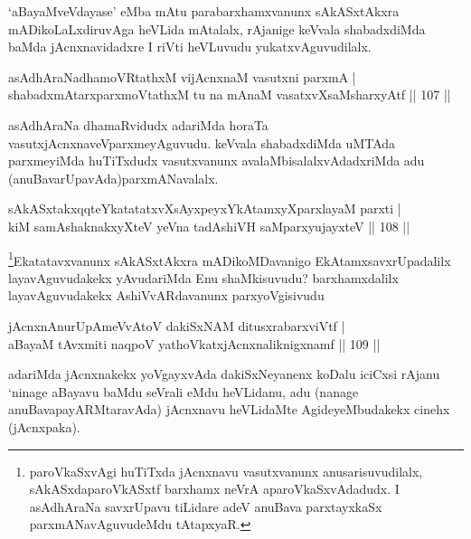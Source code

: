 \begin{artha}
`aBayaMveVdayase' eMba mAtu parabarxhamxvanunx sAkASxtAkxra mADikoLaLxdiruvAga heVLida mAtalalx, rAjanige keVvala shabadxdiMda baMda jAcnxnavidadxre I riVti heVLuvudu yukatxvAguvudilalx.
\end{artha}

\begin{shl}
asAdhAraNadhamoVRtathxM vijAcnxnaM vasutxni parxmA |\\
shabadxmAtarxparxmoVtathxM tu na mAnaM vasatxvXsaMsharxyAtf \hfill || 107 || 
\end{shl}

\begin{artha}
asAdhAraNa dhamaRvidudx adariMda horaTa vasutxjAcnxnaveV\break parxmeyAguvudu. keVvala shabadxdiMda uMTAda parxmeyiMda huTiTxdudx vasutxvanunx avalaMbisalalxvAdadxriMda adu (anuBavarUpavAda)\break parxmANavalalx.
\end{artha}

\begin{shl}
sAkASxtakxqqteYkatatatxvXsAyxpeyxYkAtamxyXparxlayaM parxti |\\
kiM samAshaknakxyXteV yeVna tadAshiVH saMparxyujayxteV \hfill || 108 || 
\end{shl}

\begin{artha}
\footnote{paroVkaSxvAgi huTiTxda jAcnxnavu vasutxvanunx anusarisuvudilalx, sAkASxdaparoVkASxtf barxhamx neVrA aparoVkaSxvAdadudx. I asAdhAraNa savxrUpavu tiLidare adeV anuBava parxtayxkaSx parxmANavAguvudeMdu tAtapxyaR.}Ekatatavxvanunx sAkASxtAkxra mADikoMDavanigo EkAtamxsavxrUpadalilx layavAguvudakekx yAvudariMda Enu shaMkisuvudu? barxhamxdalilx layavAguvudakekx AshiVvARdavanunx parxyoVgisivudu
\end{artha}

\begin{shl}
jAcnxnAnurUpAmeVvAtoV dakiSxNAM ditusxrabarxviVtf |\\
aBayaM tAvxmiti naqpoV yathoVkatxjAcnxnaliknigxnamf \hfill || 109 || 
\end{shl}

\begin{artha}
adariMda jAcnxnakekx yoVgayxvAda dakiSxNeyanenx koDalu iciCxsi rAjanu `ninage aBayavu baMdu seVrali eMdu heVLidanu, adu (nanage anuBavapayARMtaravAda) jAcnxnavu heVLidaMte Agide\-\break yeMbudakekx cinehx (jAcnxpaka).
\end{artha}


